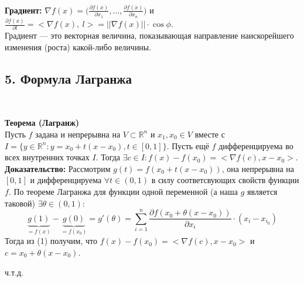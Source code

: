 \documentclass[book, 11pt]{report}
\begin{document}
        \par
        \noindent\hrulefill\noindent
        \par{\ }
        \par{\textbf{Градиент: } $\displaystyle\nabla f(x)=\bigg(\frac{\partial f(x)}{\partial x_1},\ldots,\frac{\partial f(x)}{\partial x_n}\bigg)$ и $\displaystyle\frac{\partial f(x)}{\partial l}=<\nabla f(x), \ l>=||\nabla f(x)||\cdot\cos{\phi}$.\\
        Градиент — это векторная величина, показывающая направление наискорейшего изменения (роста) какой-либо величины.}
        \newpage
        \subsection*{5. Формула Лагранжа}
        \par{\ }
        \par{\textbf{Теорема (Лагранж)}\\
        Пусть $f$ задана и непрерывна на $V\subset\mathbb{R}^n$ и $x_1,x_0\in V$ вместе с $I=\{y\in\mathbb{R}^n:y=x_0+t(x-x_0), t\in[0,1]\}$. Пусть ещё $f$ дифференцируема во всех внутренних точках $I$. Тогда $\exists c\in I:f(x)-f(x_0)=<\nabla f(c),x-x_0>$.\\
        \textbf{Доказательство: }Рассмотрим $g(t)=f(x_0+t(x-x_0))$, она непрерывна на $[0,1]$ и дифференцируема $\forall t\in(0,1)$ в силу соответсвующих свойств функции $f$. По теореме Лагранжа для функции одной переменной (а наша $g$ является таковой) $\exists\theta\in(0,1):$
        \begin{equation}
            \underbrace{g(1)}_{=f(x)}-\underbrace{g(0)}_{=f(x_0)}=g'(\theta)=\sum_{i=1}^n\frac{\partial f(x_0+\theta(x-x_0))}{\partial x_i}\cdot(x_i-x_{i_0})
        \end{equation}
        Тогда из (1) получим, что $f(x)-f(x_0)=<\nabla f(c),x-x_0>$ и $c=x_0+\theta(x-x_0)$.
        }
        \par{{\raggedleft ч.т.д.\par}}
\end{document}
